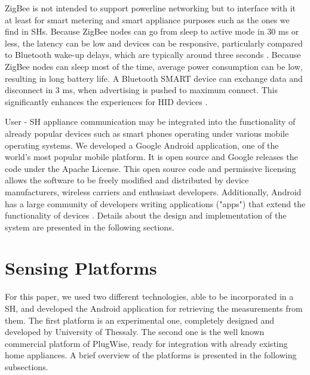 \documentclass[conference]{IEEEtran}
\begin{document}
ZigBee is not intended to support powerline networking but to interface with it at least for smart metering and smart appliance purposes such as the ones we find in SHs.
Because ZigBee nodes can go from sleep to active mode in 30 ms or less, the latency can be low and devices can be responsive, particularly compared to Bluetooth wake-up delays, which are typically around three seconds \cite{paper}.
Because ZigBee nodes can sleep most of the time, average power consumption can be low, resulting in long battery life. 
A Bluetooth SMART device can exchange data and disconnect in 3 ms, when advertising is pushed to maximum connect. 
This significantly enhances the experiences for HID devices \cite{zigbee}.







User - SH appliance communication may be integrated into the functionality of already popular devices such as smart phones operating under various mobile operating systems. 
We developed a Google Android application, one of the world's most popular mobile platform. 
It is open source and Google releases the code under the Apache License. 
This open source code and permissive licensing allows the software to be freely modified and distributed by device manufacturers, wireless carriers and enthusiast developers. 
Additionally, Android has a large community of developers writing applications ("apps") that extend the functionality of devices \cite{android}.
Details about the design and implementation of the system are presented in the following sections.

\section{Sensing Platforms}
For this paper, we used two different technologies, able to be incorporated in a SH, and developed the Android application for retrieving the measurements from them. 
The first platform is an experimental one, completely designed and developed by University of Thessaly. 
The second one is the well known commercial platform of PlugWise, ready for integration with already existing home appliances. 
A brief overview of the platforms is presented in the following subsections.
\end{document}
